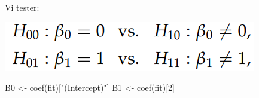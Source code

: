 \documentclass[
]{article}
\newenvironment{Shaded}{\begin{snugshade}}{\end{snugshade}}
\newcommand{\DecValTok}[1]{\textcolor[rgb]{0.00,0.00,0.81}{#1}}
\newcommand{\FunctionTok}[1]{\textcolor[rgb]{0.00,0.00,0.00}{#1}}
\newcommand{\NormalTok}[1]{#1}
\newcommand{\OtherTok}[1]{\textcolor[rgb]{0.56,0.35,0.01}{#1}}
\newcommand{\StringTok}[1]{\textcolor[rgb]{0.31,0.60,0.02}{#1}}
\begin{document}
Vi tester:~

\includegraphics{images/paste-F94E956B.png}

\begin{Shaded}
\begin{Highlighting}[]
\NormalTok{B0 }\OtherTok{\textless{}{-}} \FunctionTok{coef}\NormalTok{(fit)[}\StringTok{"(Intercept)"}\NormalTok{]}
\NormalTok{B1 }\OtherTok{\textless{}{-}} \FunctionTok{coef}\NormalTok{(fit)[}\DecValTok{2}\NormalTok{]}
\end{Highlighting}
\end{Shaded}
\end{document}
